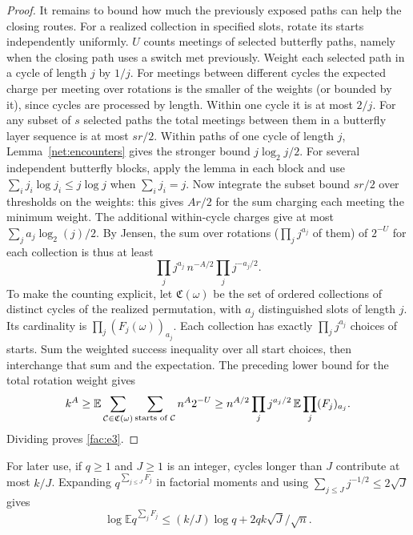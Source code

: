 \begin{proof}
It remains to bound how much the previously exposed paths can help the closing routes. For a realized collection in specified slots, rotate its starts independently uniformly. $U$ counts meetings of selected butterfly paths, namely when the closing path uses a switch met previously. Weight each selected path in a cycle of length $j$ by $1/j$. For meetings between different cycles the expected charge per meeting over rotations is the smaller of the weights (or bounded by it), since cycles are processed by length. Within one cycle it is at most $2/j$. For any subset of $s$ selected paths the total meetings between them in a butterfly layer sequence is at most $sr/2$. Within paths of one cycle of length $j$, Lemma~\ref{net:encounters}
gives the stronger bound $j\log_2j/2$. For several independent
butterfly blocks, apply the lemma in each block and use
$\sum_i j_i\log j_i\le j\log j$ when $\sum_i j_i=j$.
Now integrate the subset bound $sr/2$ over thresholds on the weights: this gives $Ar/2$ for the sum charging each meeting the minimum weight. The additional within-cycle charges give at most $\sum_j a_j\log_2(j)/2$. By Jensen, the sum over rotations ($\prod_j j^{a_j}$ of them) of $2^{-U}$ for each collection is thus at least
\[
\prod_j j^{a_j}\, n^{-A/2}\prod_j j^{-a_j/2}.
\]
To make the counting explicit, let $\mathfrak C(\omega)$ be the set of ordered collections of distinct cycles of the realized permutation, with $a_j$ distinguished slots of length $j$. Its cardinality is $\prod_j(F_j(\omega))_{a_j}$. Each collection has exactly $\prod_jj^{a_j}$ choices of starts. Sum the weighted success inequality over all start choices, then interchange that sum and the expectation. The preceding lower bound for the total rotation weight gives
\[
 k^A\ge \mathbb E\sum_{\mathcal C\in\mathfrak C(\omega)}
             \sum_{\text{starts of }\mathcal C} n^A2^{-U}
 \ge n^{A/2}\prod_jj^{a_j/2}\,
              \mathbb E\prod_j(F_j)_{a_j}.
\]
Dividing proves \eqref{fac:e3}.
\end{proof}

For later use, if $q\ge1$ and $J\ge1$ is an integer, cycles longer than $J$ contribute at most $k/J$. Expanding $q^{\sum_{j\le J}F_j}$ in factorial moments and using $\sum_{j\le J}j^{-1/2}\le2\sqrt J$ gives
\begin{equation}
\log \mathbb E q^{\sum_j F_j}\le (k/J)\log q+2q k\sqrt J/\sqrt n .
\label{fac:e4}
\end{equation}

